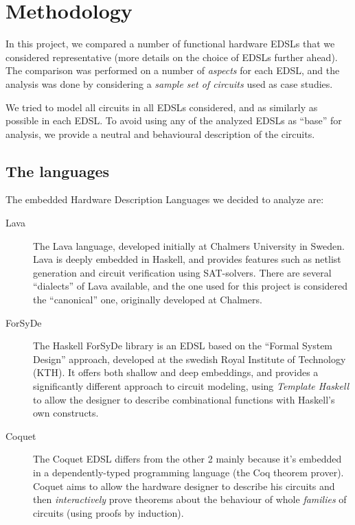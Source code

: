 \section{Methodology}
\label{sec:methods}

    In this project, we compared a number of functional hardware \acp{EDSL} that we considered
    representative (more details on the choice of \acp{EDSL} further ahead). The comparison was performed
    on a number of \emph{aspects} for each \ac{EDSL}, and the analysis was done by considering a
    \emph{sample set of circuits} used as case studies.

    We tried to model all circuits in all \acp{EDSL} considered, and as similarly as possible in each
    EDSL. To avoid using any of the analyzed \acp{EDSL} as ``base'' for analysis, we provide a neutral
    and behavioural description of the circuits.

    \subsection{The languages}
    \label{subsec:languages}
        The embedded Hardware Description Languages we decided to analyze are:

        \begin{description}
            \item[Lava] The Lava\cite{lava1998} language, developed initially at Chalmers University
            in Sweden.  Lava is deeply embedded in Haskell, and provides features such as netlist
            generation and circuit verification using SAT-solvers. There are several ``dialects'' of
            Lava available, and the one used for this project is considered the ``canonical'' one,
            originally developed at Chalmers.

            \item[ForSyDe] The Haskell ForSyDe library is an \ac{EDSL} based on the ``Formal System
            Design'' approach\cite{forsyde1999}, developed at the swedish Royal Institute of
            Technology (KTH).  It offers both shallow and deep embeddings, and provides a
            significantly different approach to circuit modeling, using \emph{Template Haskell} to
            allow the designer to describe combinational functions with Haskell's own constructs.

            \item[Coquet] The Coquet\cite{coquet2011} \ac{EDSL} differs from the other 2 mainly because
            it's embedded in a dependently-typed programming language (the Coq theorem prover).
            Coquet aims to allow the hardware designer to describe his circuits and then
            \emph{interactively} prove theorems about the behaviour of whole \emph{families} of
            circuits (using proofs by induction).
        \end{description}


